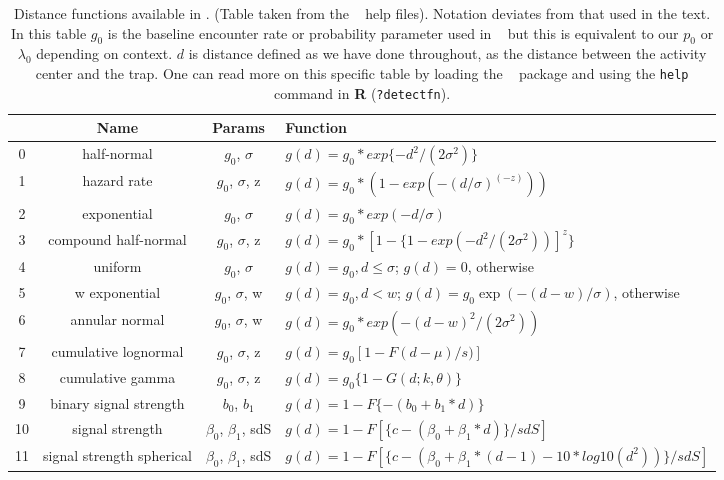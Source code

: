\begin{table}[ht]
\centering
\caption{
  Distance functions available in \secr.  (Table taken from the \secr~
  help files). Notation deviates from that used in the text.
  In this table $g_{0}$ is the baseline encounter rate or probability
  parameter used in \secr~ but this is equivalent to our $p_{0}$ or
  $\lambda_{0}$ depending on context. $d$ is distance defined as we have done throughout,
  as the distance between the activity center and the trap.
  One can read more on this specific table by loading the \secr~ package and using the
  {\tt help} command in {\bf R} ({\tt ?detectfn}).
}
\begin{tabular}{cccl}
\hline \hline
 & Name & Params & Function  \\ \hline
0 & half-normal &$g_0$, $\sigma$          &  $g(d) = g_0 * exp\{-d^2 / (2  \sigma^2) \}$  \\
1 &hazard rate  & $g_0$, $\sigma$, z      &  $g(d) = g_0 * (1 - exp(- (d / \sigma) ^(-z) ))$ \\
2 &exponential   &$g_0$, $\sigma$    &  $g(d) = g_0 * exp(- d / \sigma)$ \\
3 &compound half-normal  & $g_0$, $\sigma$, z & $g(d) = g_0 * [1 - \{1 - exp(-d^2 / (2 \sigma^2))]^z\}$ \\
4 &uniform     & $g_0$, $\sigma$     &
\parbox[t]{2in}{ $g(d) = g_{0}, d \leq \sigma$; \\
                 $g(d)= 0$, otherwise
} \\
5 &w exponential            & $g_0$, $\sigma$, w &
\parbox[t]{2in}{ $g(d) = g_{0}, d < w$; \\
                 $g(d) = g_{0} \exp(- (d - w) / \sigma)$, otherwise
} \\
6 &annular normal           & $g_0$, $\sigma$, w & $g(d) = g_0 * exp(-(d-w)^2 / (2 \sigma^2))$ \\
7 &cumulative lognormal     & $g_0$, $\sigma$, z & $g(d) = g_0 [1 -F{(d-\mu)/s)}]$  \\
8 &cumulative gamma         & $g_0$, $\sigma$, z  & $g(d) = g_0 \{ 1 - G (d; k,  \theta) \}$  \\
9 &binary signal strength   & $b_0$, $b_1$       & $g(d) = 1 - F \{- (b_0 + b_1 * d) \}$ \\
10&signal strength          & $\beta_0$, $\beta_1$, sdS  &
  $g(d) = 1 - F[ \{c - (\beta_0 + \beta_1 * d)\} / sdS]$  \\
11&signal strength spherical&  $\beta_0$, $\beta_1$, sdS & 
\parbox[t]{2in}{ $g(d) = 1 - F[\{c - (\beta_0 + \beta_1 * (d-1)- 10 * log10 ( d^2 ) ) \} / sdS ]$ 
} \\

\end{tabular}
\label{covariates.tab.detmodels}
\end{table}

